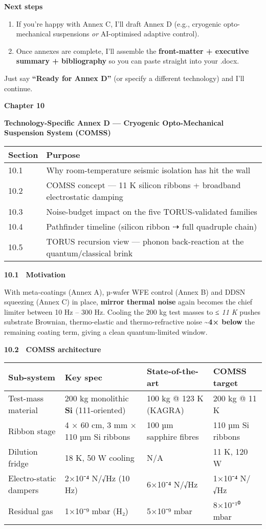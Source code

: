 \documentclass[]{article}
\begin{document}
\textbf{Next steps}

\begin{enumerate}
\def\labelenumi{\arabic{enumi}.}
\item
  If you're happy with Annex C, I'll draft Annex D (e.g., cryogenic
  opto-mechanical suspensions \emph{or} AI-optimised adaptive control).
\item
  Once annexes are complete, I'll assemble the \textbf{front-matter +
  executive summary + bibliography} so you can paste straight into your
  .docx.
\end{enumerate}

Just say \textbf{``Ready for Annex D''} (or specify a different
technology) and I'll continue.

\textbf{Chapter 10}

\textbf{Technology-Specific Annex D --- Cryogenic Opto-Mechanical
Suspension System (COMSS)}

\begin{longtable}[]{@{}ll@{}}
\toprule
\textbf{Section} & \textbf{Purpose}\tabularnewline
\midrule
\endhead
10.1 & Why room-temperature seismic isolation has hit the
wall\tabularnewline
10.2 & COMSS concept --- 11 K silicon ribbons + broadband electrostatic
damping\tabularnewline
10.3 & Noise-budget impact on the five TORUS-validated
families\tabularnewline
10.4 & Pathfinder timeline (silicon ribbon ⇢ full quadruple
chain)\tabularnewline
10.5 & TORUS recursion view --- phonon back-reaction at the
quantum/classical brink\tabularnewline
\bottomrule
\end{longtable}

\textbf{10.1 Motivation}

With meta-coatings (Annex A), µ-wafer WFE control (Annex B) and DDSN
squeezing (Annex C) in place, \textbf{mirror thermal noise} again
becomes the chief limiter between 10 Hz -- 300 Hz. Cooling the 200 kg
test masses to \emph{≤ 11 K} pushes substrate Brownian, thermo-elastic
and thermo-refractive noise \textbf{\textasciitilde{}4× below} the
remaining coating term, giving a clean quantum-limited window.

\textbf{10.2 COMSS architecture}

\begin{longtable}[]{@{}llll@{}}
\toprule
\textbf{Sub-system} & \textbf{Key spec} & \textbf{State-of-the-art} &
\textbf{COMSS target}\tabularnewline
\midrule
\endhead
Test-mass material & 200 kg monolithic \textbf{Si} (111-oriented) & 100
kg @ 123 K (KAGRA) & 200 kg @ 11 K\tabularnewline
Ribbon stage & 4 × 60 cm, 3 mm × 110 µm Si ribbons & 100 µm sapphire
fibres & 110 µm Si ribbons\tabularnewline
Dilution fridge & 18 K, 50 W cooling & N/A & 11 K, 120 W\tabularnewline
Electro-static dampers & 2×10⁻⁴ N/√Hz (10 Hz) & 6×10⁻⁴ N/√Hz & 1×10⁻⁴
N/√Hz\tabularnewline
Residual gas & 1×10⁻⁹ mbar (H₂) & 5×10⁻⁹ mbar & 8×10⁻¹⁰
mbar\tabularnewline
\bottomrule
\end{longtable}
\end{document}
